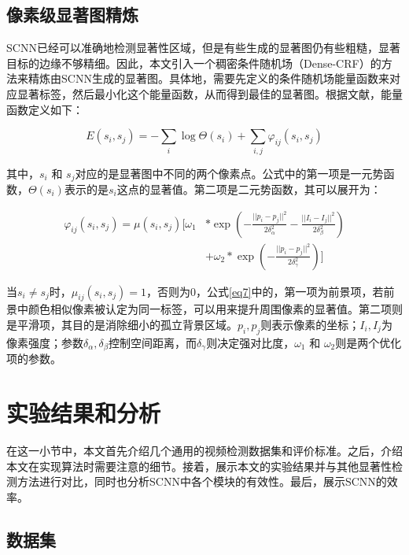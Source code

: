 \subsection{像素级显著图精炼}

SCNN已经可以准确地检测显著性区域，但是有些生成的显著图仍有些粗糙，显著目标的边缘不够精细。因此，本文引入一个稠密条件随机场（Dense-CRF）的方法来精炼由SCNN生成的显著图。具体地，需要先定义的条件随机场能量函数来对应显著标签，然后最小化这个能量函数，从而得到最佳的显著图。根据文献\cite{krahenbuhl2011efficient}，能量函数定义如下：

\begin{equation}
   \label{eq6}
   E(s_i, s_j) = -\sum_i \log\Theta(s_i) + \sum_{i,j} \varphi_{ij}(s_i, s_j)
\end{equation}

其中，$s_i $ 和 $s_j$对应的是显著图中不同的两个像素点。公式中的第一项是一元势函数，$\Theta(s_i)$表示的是$s_i $这点的显著值。第二项是二元势函数，其可以展开为：

\begin{equation}
 \label{eq7}
 \begin{aligned}
   \varphi_{ij}(s_i, s_j) = \mu(s_i, s_j)[\omega_1&*\exp(-\frac{||p_i-p_j||^2}{2\delta_\alpha^2}-\frac{||I_i-I_j||^2}{2\delta_\beta^2}) \\
   &+ \omega_2*\exp(-\frac{||p_i-p_j||^2}{2\delta_\gamma^2})]
  \end{aligned}
\end{equation}

当$s_i \neq s_j$时，$\mu_{ij}(s_i, s_j) = 1$，否则为0，公式\ref{eq7}中的，第一项为前景项，若前景中颜色相似像素被认定为同一标签，可以用来提升周围像素的显著值。第二项则是平滑项，其目的是消除细小的孤立背景区域。$p_i, p_j$则表示像素的坐标；$I_i, I_j$为像素强度；参数$\delta_\alpha, \delta_\beta$控制空间距离，而$\delta_\gamma$则决定强对比度，$\omega_1$ 和 $\omega_2$则是两个优化项的参数。

\section{实验结果和分析}
在这一小节中，本文首先介绍几个通用的视频检测数据集和评价标准。之后，介绍本文在实现算法时需要注意的细节。接着，展示本文的实验结果并与其他显著性检测方法进行对比，同时也分析SCNN中各个模块的有效性。最后，展示SCNN的效率。
\subsection{数据集}

